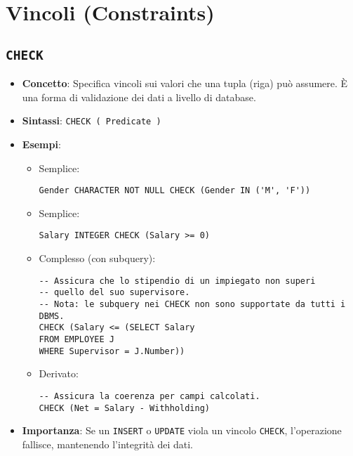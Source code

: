 \section{Vincoli (Constraints)}

\subsection{\texttt{CHECK}}
\begin{itemize}
	\item \textbf{Concetto}: Specifica vincoli sui valori che una tupla (riga) può assumere. È una forma di validazione dei dati a livello di database.
	\item \textbf{Sintassi}: \texttt{CHECK ( Predicate )}
	\item \textbf{Esempi}:
	\begin{itemize}
		\item Semplice:
		\begin{verbatim}
Gender CHARACTER NOT NULL CHECK (Gender IN ('M', 'F'))
		\end{verbatim}
		\item Semplice:
		\begin{verbatim}
Salary INTEGER CHECK (Salary >= 0)
		\end{verbatim}
		\item Complesso (con subquery):
		\begin{verbatim}
-- Assicura che lo stipendio di un impiegato non superi
-- quello del suo supervisore.
-- Nota: le subquery nei CHECK non sono supportate da tutti i DBMS.
CHECK (Salary <= (SELECT Salary
FROM EMPLOYEE J
WHERE Supervisor = J.Number))
		\end{verbatim}
		\item Derivato:
		\begin{verbatim}
-- Assicura la coerenza per campi calcolati.
CHECK (Net = Salary - Withholding)
		\end{verbatim}
	\end{itemize}
	\item \textbf{Importanza}: Se un \texttt{INSERT} o \texttt{UPDATE} viola un vincolo \texttt{CHECK}, l'operazione fallisce, mantenendo l'integrità dei dati.
\end{itemize}

